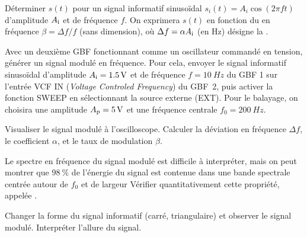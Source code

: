 
 \begin{protocole}
  \todo Déterminer $s(t)$ pour un signal informatif sinusoïdal $s_i(t) = A_i \cos(2\pi f t)$ d’amplitude $A_{\rm i}$ et de fréquence $f$. On exprimera $s(t)$ en fonction du  en fréquence $\beta=\Delta f/f$ (sans dimension), où  $\Delta f=\alpha A_{\rm{i}}$ (en Hz) désigne la  . 
 \item  Avec un deuxième GBF fonctionnant comme un oscillateur commandé en tension, générer un signal modulé en fréquence. Pour cela, envoyer le signal informatif sinusoïdal d’amplitude $A_{\rm i}=\SI{1.5}{V}$ et de fréquence $f=\SI{10}{Hz}$ du GBF 1 sur l'entrée VCF IN (\textit{Voltage Controled Frequency}) du GBF~2, puis activer la fonction SWEEP en sélectionnant la
source externe (EXT). Pour le balayage, on choisira une amplitude $A_{\rm{p}}=\SI{5}{V}$ et une fréquence centrale $f_{0}=\SI{200}{Hz}$.
 \item Visualiser le signal modulé à l’oscilloscope. Calculer la déviation en fréquence $\Delta f$, le coefficient $\alpha$, et le taux de modulation $\beta$.


\item Le spectre en fréquence du signal modulé est difficile à interpréter, mais on peut montrer que $\SI{98}{\%}$ de l’énergie du signal est contenue dans une bande spectrale centrée autour de $f_0$ et de largeur 
 Vérifier quantitativement cette propriété, appelée .
\item  Changer la forme du signal informatif (carré, triangulaire) et observer le signal modulé. Interpréter l’allure du signal.

 \end{protocole}

